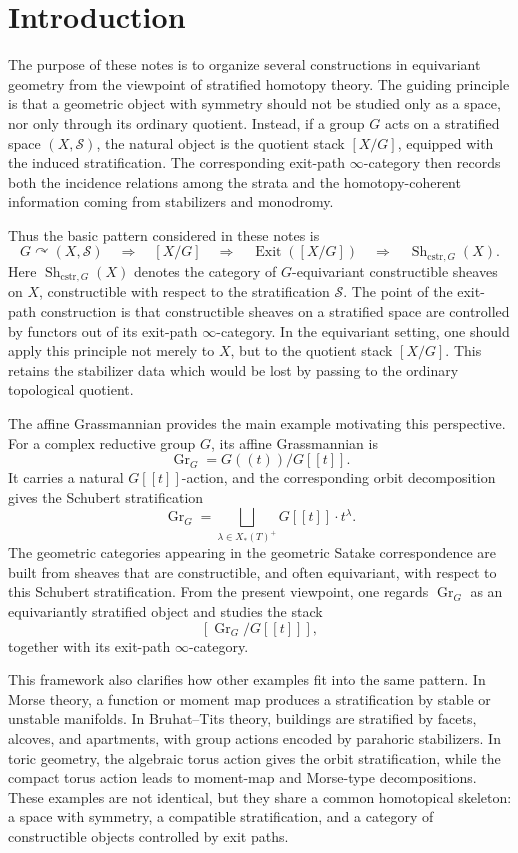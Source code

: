 \section{Introduction}

The purpose of these notes is to organize several constructions in equivariant
geometry from the viewpoint of stratified homotopy theory. The guiding principle
is that a geometric object with symmetry should not be studied only as a space,
nor only through its ordinary quotient. Instead, if a group \(G\) acts on a
stratified space \((X,\mathcal S)\), the natural object is the quotient stack
\([X/G]\), equipped with the induced stratification. The corresponding
exit-path \(\infty\)-category then records both the incidence relations among
the strata and the homotopy-coherent information coming from stabilizers and
monodromy.

Thus the basic pattern considered in these notes is
\[
G\curvearrowright (X,\mathcal S)
\quad\Longrightarrow\quad
[X/G]
\quad\Longrightarrow\quad
\operatorname{Exit}([X/G])
\quad\Longrightarrow\quad
\operatorname{Sh}_{\mathrm{cstr},G}(X).
\]
Here \(\operatorname{Sh}_{\mathrm{cstr},G}(X)\) denotes the category of
\(G\)-equivariant constructible sheaves on \(X\), constructible with respect to
the stratification \(\mathcal S\). The point of the exit-path construction is
that constructible sheaves on a stratified space are controlled by functors out
of its exit-path \(\infty\)-category. In the equivariant setting, one should
apply this principle not merely to \(X\), but to the quotient stack \([X/G]\).
This retains the stabilizer data which would be lost by passing to the ordinary
topological quotient.

The affine Grassmannian provides the main example motivating this perspective.
For a complex reductive group \(G\), its affine Grassmannian is
\[
\operatorname{Gr}_G = G((t))/G[[t]].
\]
It carries a natural \(G[[t]]\)-action, and the corresponding orbit
decomposition gives the Schubert stratification
\[
\operatorname{Gr}_G
=
\bigsqcup_{\lambda\in X_*(T)^+}
G[[t]]\cdot t^\lambda .
\]
The geometric categories appearing in the geometric Satake correspondence are
built from sheaves that are constructible, and often equivariant, with respect
to this Schubert stratification. From the present viewpoint, one regards
\(\operatorname{Gr}_G\) as an equivariantly stratified object and studies the
stack
\[
[\operatorname{Gr}_G/G[[t]]],
\]
together with its exit-path \(\infty\)-category.

This framework also clarifies how other examples fit into the same pattern.
In Morse theory, a function or moment map produces a stratification by stable
or unstable manifolds. In Bruhat--Tits theory, buildings are stratified by
facets, alcoves, and apartments, with group actions encoded by parahoric
stabilizers. In toric geometry, the algebraic torus action gives the orbit
stratification, while the compact torus action leads to moment-map and
Morse-type decompositions. These examples are not identical, but they share a
common homotopical skeleton: a space with symmetry, a compatible
stratification, and a category of constructible objects controlled by exit
paths.

